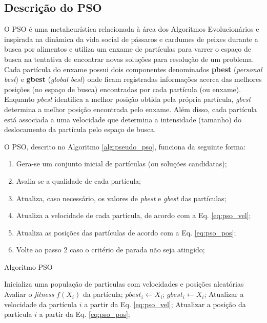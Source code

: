 \documentclass[
	12pt,				%
	openany,			%
	oneside,	
	a4paper,			%
	brazil,				%
	]{unimontes-ppgmsc-abntex2}
\begin{document}
\subsection{Descrição do PSO}
\label{sec:desc_pso}

O PSO é uma metaheurística relacionada à área dos Algoritmos Evolucionários e inspirada na dinâmica da vida social de pássaros e cardumes de peixes durante a busca por alimentos \cite{Kennedy_1995} e utiliza um enxame de partículas para varrer o espaço de busca na tentativa de encontrar novas soluções para resolução de um problema. Cada partícula do enxame possui dois componentes denominados \textbf{pbest} ({\em personal best}) e \textbf{gbest} ({\em global best}) onde ficam registradas informações acerca das melhores posições (no espaço de busca) encontradas por cada partícula (ou enxame). Enquanto {\em pbest} identifica a melhor posição obtida pela própria partícula, {\em gbest} determina a melhor posição encontrada pelo enxame. Além disso, cada partícula está associada a uma velocidade que determina a intensidade (tamanho) do deslocamento da partícula pelo espaço de busca. 

O PSO, descrito no Algoritmo \ref{alg:pseudo_pso}, funciona da seguinte forma: 

\begin{enumerate}[label=\arabic*)]
\item Gera-se um conjunto inicial de partículas (ou soluções candidatas);
\item Avalia-se a qualidade de cada partícula;
\item Atualiza, caso necessário, os valores de {\em pbest} e {\em gbest} das partículas;
\item Atualiza a velocidade de cada partícula, de acordo com a Eq. \ref{eq:pso_vel};
\item Atualiza as posições das partículas de acordo com a Eq. \ref{eq:pso_pos};
\item Volte ao passo 2 caso o critério de parada não seja atingido;
\end{enumerate}

\begin{algorithm}[ht]
\caption{Algoritmo PSO}
\label{alg:pseudo_pso}
\begin{algorithmic}[1]
\State Inicializa uma população de partículas com velocidades e posições aleatórias
		\State Avaliar o \textit{fitness} $f(X_i)$ da partícula;
		   \State $pbest_i \gets X_i$;
		\EndIf
		   \State $gbest_i \gets X_i$;
		\EndIf
		\State Atualizar a velocidade da partícula $i$ a partir da Eq. \ref{eq:pso_vel};
		\State Atualizar a posição da partícula $i$ a partir da Eq. \ref{eq:pso_pos};
	\EndFor
\EndWhile
\end{algorithmic}
\end{algorithm}
\end{document}
